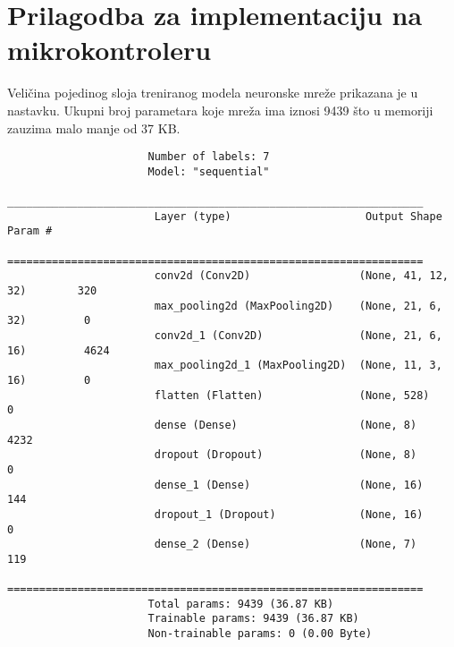 \section{Prilagodba za implementaciju na mikrokontroleru}
\label{sec:convert}

Veličina pojedinog sloja treniranog modela neuronske mreže prikazana je u nastavku.
Ukupni broj parametara koje mreža ima iznosi 9439 što u memoriji zauzima malo manje od 
37 KB.

{
\scriptsize
\begin{verbatim}
                      Number of labels: 7            
                      Model: "sequential"
                      _________________________________________________________________
                       Layer (type)                     Output Shape            Param #   
                      =================================================================
                       conv2d (Conv2D)                 (None, 41, 12, 32)        320                                                                       
                       max_pooling2d (MaxPooling2D)    (None, 21, 6, 32)         0                                                                                                                                  
                       conv2d_1 (Conv2D)               (None, 21, 6, 16)         4624                                                                      
                       max_pooling2d_1 (MaxPooling2D)  (None, 11, 3, 16)         0                                                                                                                                    
                       flatten (Flatten)               (None, 528)               0                                                                        
                       dense (Dense)                   (None, 8)                 4232                                                                    
                       dropout (Dropout)               (None, 8)                 0                                                                        
                       dense_1 (Dense)                 (None, 16)                144                                                                      
                       dropout_1 (Dropout)             (None, 16)                0                                                                        
                       dense_2 (Dense)                 (None, 7)                 119                           
                      =================================================================
                      Total params: 9439 (36.87 KB)
                      Trainable params: 9439 (36.87 KB)
                      Non-trainable params: 0 (0.00 Byte)
\end{verbatim}
}

